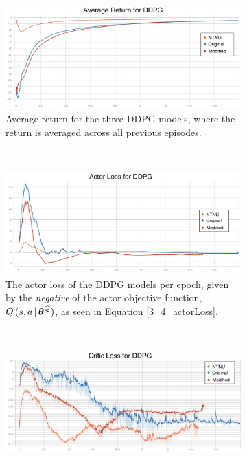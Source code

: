 \begin{figure}[H]
     \centering
     \begin{subfigure}[b]{0.78\textwidth}
         \centering
         \captionsetup{justification=centering}
         \includegraphics[width=\textwidth]{figures/5_/Training/ddpg_return.png}
         \caption{Average return for the three DDPG models, where the return is averaged across all previous episodes.}
         \label{fig:training_ddpgReturn}
     \end{subfigure} 
     \hfill \\[5mm]
     \begin{subfigure}[b]{0.78\textwidth}
         \centering
         \captionsetup{justification=centering}
         \includegraphics[width=\textwidth]{figures/5_/Training/ddpg_actorLoss.png}
         \caption{The actor loss of the DDPG models per epoch, given by the \textit{negative} of the actor objective function, $Q\,(s,a \,|\, \boldsymbol{\theta}^Q)$, as seen in Equation \eqref{3_4_actorLoss}.}
         \label{fig:training_ddpgActorLoss}
     \end{subfigure}
     \hfill \\[5mm]
     \begin{subfigure}[b]{0.78\textwidth}
         \centering
         \captionsetup{justification=centering}
         \includegraphics[width=\textwidth]{figures/5_/Training/ddpg_criticLoss.png}

\end{subfigure}
\end{figure}
